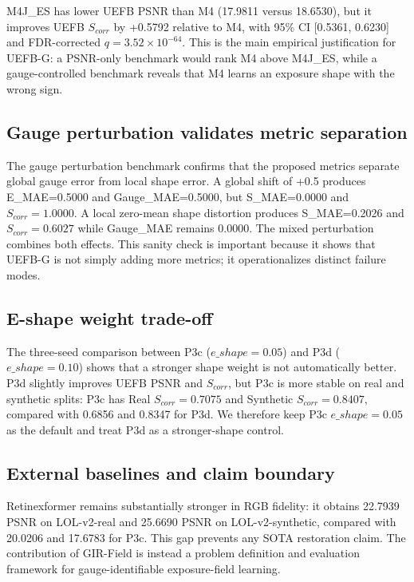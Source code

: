 M4J\_ES has lower UEFB PSNR than M4 (17.9811 versus 18.6530), but it improves UEFB $S_{corr}$ by +0.5792 relative to M4, with 95\% CI [0.5361, 0.6230] and FDR-corrected $q=3.52\times10^{-64}$. This is the main empirical justification for UEFB-G: a PSNR-only benchmark would rank M4 above M4J\_ES, while a gauge-controlled benchmark reveals that M4 learns an exposure shape with the wrong sign.

\subsection{Gauge perturbation validates metric separation}

The gauge perturbation benchmark confirms that the proposed metrics separate global gauge error from local shape error. A global shift of +0.5 produces E\_MAE=0.5000 and Gauge\_MAE=0.5000, but S\_MAE=0.0000 and $S_{corr}=1.0000$. A local zero-mean shape distortion produces S\_MAE=0.2026 and $S_{corr}=0.6027$ while Gauge\_MAE remains 0.0000. The mixed perturbation combines both effects. This sanity check is important because it shows that UEFB-G is not simply adding more metrics; it operationalizes distinct failure modes.

\subsection{E-shape weight trade-off}

The three-seed comparison between P3c ($e\_shape=0.05$) and P3d ($e\_shape=0.10$) shows that a stronger shape weight is not automatically better. P3d slightly improves UEFB PSNR and $S_{corr}$, but P3c is more stable on real and synthetic splits: P3c has Real $S_{corr}=0.7075$ and Synthetic $S_{corr}=0.8407$, compared with 0.6856 and 0.8347 for P3d. We therefore keep P3c $e\_shape=0.05$ as the default and treat P3d as a stronger-shape control.

\subsection{External baselines and claim boundary}

Retinexformer remains substantially stronger in RGB fidelity: it obtains 22.7939 PSNR on LOL-v2-real and 25.6690 PSNR on LOL-v2-synthetic, compared with 20.0206 and 17.6783 for P3c. This gap prevents any SOTA restoration claim. The contribution of GIR-Field is instead a problem definition and evaluation framework for gauge-identifiable exposure-field learning.

